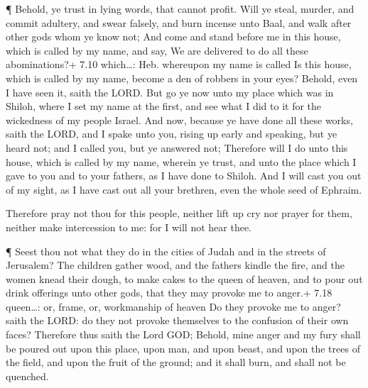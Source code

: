  ¶ Behold, ye trust in lying words, that cannot profit.
 Will ye steal, murder, and commit adultery, and swear
falsely, and burn incense unto Baal, and walk after other gods whom ye
know not;  And come and stand before me in this house,
which is called by my name, and say, We are delivered to do all these
abominations?+ 7.10 which\ldots: Heb. whereupon my name is called
 Is this house, which is called by my name, become a den of
robbers in your eyes? Behold, even I have seen it, saith the LORD.
 But go ye now unto my place which was in Shiloh, where I
set my name at the first, and see what I did to it for the wickedness of
my people Israel.  And now, because ye have done all these
works, saith the LORD, and I spake unto you, rising up early and
speaking, but ye heard not; and I called you, but ye answered not;
 Therefore will I do unto this house, which is called by my
name, wherein ye trust, and unto the place which I gave to you and to
your fathers, as I have done to Shiloh.  And I will cast
you out of my sight, as I have cast out all your brethren, even the
whole seed of Ephraim.

 Therefore pray not thou for this people, neither lift up
cry nor prayer for them, neither make intercession to me: for I will not
hear thee.

 ¶ Seest thou not what they do in the cities of Judah and
in the streets of Jerusalem?  The children gather wood, and
the fathers kindle the fire, and the women knead their dough, to make
cakes to the queen of heaven, and to pour out drink offerings unto other
gods, that they may provoke me to anger.+ 7.18 queen\ldots: or, frame,
or, workmanship of heaven  Do they provoke me to anger?
saith the LORD: do they not provoke themselves to the confusion of their
own faces?  Therefore thus saith the Lord GOD; Behold, mine
anger and my fury shall be poured out upon this place, upon man, and
upon beast, and upon the trees of the field, and upon the fruit of the
ground; and it shall burn, and shall not be quenched.

